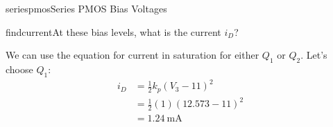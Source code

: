 \begin{mainquestion}{seriespmos}{Series PMOS Bias Voltages}
\begin{partquestion}{findcurrent}{At these bias levels, what is the current $i_{D}$?}
\begin{answer}
We can use the equation for current in saturation for either $Q_{1}$ or $Q_{2}$. Let's choose $Q_{1}$:
\begin{align*}
    i_D &= \frac{1}{2} k_p (V_3 - 11)^2 \\
    &= \frac{1}{2} (1) (12.573 - 11)^2 \\
    &= \qty{1.24}{\milli\ampere}
\end{align*}
\end{answer}
\end{partquestion}

\end{mainquestion}
